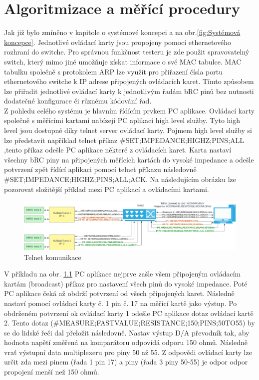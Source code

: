 \chapter{Algoritmizace a měřící procedury}
Jak již bylo zmíněno v kapitole o systémové koncepci a na obr.\ref{fig:Systémová koncepce}.
Jednotlivé ovládací karty jsou propojeny pomocí ethernetového rozhraní do switche.
Pro správnou funkčnost testeru je zde použit spravovatelný switch, který mimo jiné umožňuje
získat informace o své MAC tabulce. MAC tabulku společně s protokolem ARP lze využít pro
přiřazení čísla portu ethernetového switche k IP adrese připojených ovládacích karet. Tímto způsobem
lze přiřadit jednotlivé ovládací karty k jednotlivým řadám bRC pinů bez nutnosti dodatečné konfigurace
či různému kódování řad.\\

Z pohledu celého systému je hlavním řídícím prvkem PC aplikace.
Ovládací karty společně s měřícími kartami nabízejí PC aplikaci high level služby.
Tyto high level jsou dostupné díky telnet server ovládací karty. Pojmem high level služby
si lze představit například telnet příkaz \#SET;IMPEDANCE;HIGHZ;PINS;ALL ,tento příkaz odešle
PC aplikace některé z ovládacích karet. Karta nastaví všechny bRC piny na připojených měřících kartách
do vysoké impedance a odešle potvrzení zpět řídící aplikaci pomocí telnet příkazu následovně
\#SET;IMPEDANCE;HIGHZ;PINS;ALL;ACK. Na následujícím obrázku lze pozorovat složitější příklad mezi
PC aplikací a ovládacími kartami.

\begin{figure}[ht!]
    \centering
    \includegraphics[width = 1\textwidth]{obrazky/telnet_communication.png}
    \caption{Telnet komunikace}
    \label{fig:Telnet komunikace}
\end{figure}

V příkladu na obr. \ref{fig:Telnet komunikace} PC aplikace nejprve zašle všem připojeným ovládacím kartám
(broadcast) příkaz pro nastavení všech pinů do vysoké impedance. Poté PC aplikace čeká až obdrží potvrzení 
od všech připojených karet. Následně nastaví pomocí ovládací karty č. 1 pin č. 17 na měřící kartě jako výstup.
Po obdrženém potvrzení ok ovládací karty 1 odešle PC aplikace dotaz ovládací kartě 2. Tento dotaz
(\#MEASURE;FASTVALUE;RESISTANCE;150;PINS;50TO55) by se do lidské řeči dal přeložit následovně. Nastav 
výstup D/A převodník tak, aby hodnota napětí změřená na komparátoru odpovídá odporu 150 ohmů.
Následně vrať výstupní data multiplexeru pro piny 50 až 55.
Z odpovědi ovládací karty lze určit zda mezi pinem (řada 1 pin 17)
a piny (řada 3 piny 50-55) je odpor odpor propojení menší než 150 ohmů.\\ 

